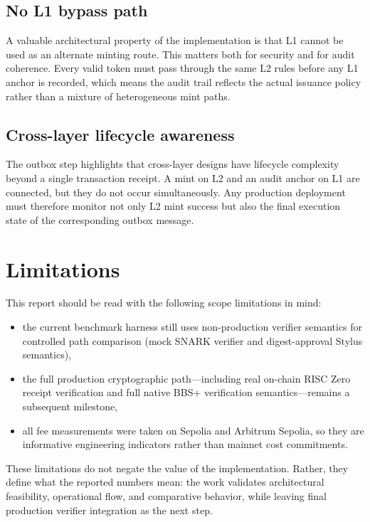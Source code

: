 \documentclass[11pt]{article}
\begin{document}
\subsection{No L1 bypass path}
A valuable architectural property of the implementation is that L1 cannot be used as an alternate minting route. This matters both for security and for audit coherence. Every valid token must pass through the same L2 rules before any L1 anchor is recorded, which means the audit trail reflects the actual issuance policy rather than a mixture of heterogeneous mint paths.

\subsection{Cross-layer lifecycle awareness}
The outbox step highlights that cross-layer designs have lifecycle complexity beyond a single transaction receipt. A mint on L2 and an audit anchor on L1 are connected, but they do not occur simultaneously. Any production deployment must therefore monitor not only L2 mint success but also the final execution state of the corresponding outbox message.

\section{Limitations}

This report should be read with the following scope limitations in mind:

\begin{itemize}
  \item the current benchmark harness still uses non-production verifier semantics for controlled path comparison (mock SNARK verifier and digest-approval Stylus semantics),
  \item the full production cryptographic path---including real on-chain RISC Zero receipt verification and full native BBS+ verification semantics---remains a subsequent milestone,
  \item all fee measurements were taken on Sepolia and Arbitrum Sepolia, so they are informative engineering indicators rather than mainnet cost commitments.
\end{itemize}

These limitations do not negate the value of the implementation. Rather, they define what the reported numbers mean: the work validates architectural feasibility, operational flow, and comparative behavior, while leaving final production verifier integration as the next step.
\end{document}
